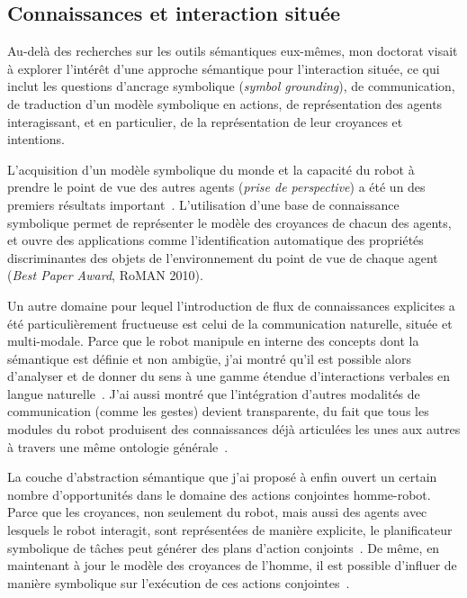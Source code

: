 \documentclass[a4paper]{article}
\begin{document}
\subsection{Connaissances et interaction située%
  \label{semantic-tools-for-grounded-interaction}%
}

Au-delà des recherches sur les outils sémantiques eux-mêmes, mon doctorat visait à
explorer l'intérêt d'une approche sémantique pour l'interaction située, ce qui
inclut les questions d'ancrage symbolique (\emph{symbol grounding}), de
communication, de traduction d'un modèle symbolique en actions, de
représentation des agents interagissant, et en particulier, de la représentation
de leur croyances et intentions.

L'acquisition d'un modèle symbolique du monde et la capacité du robot à prendre
le point de vue des autres agents (\emph{prise de perspective}) a été un des
premiers résultats important~\cite{Lemaignan2011}.  L'utilisation d'une base de
connaissance symbolique permet de représenter le modèle des croyances de chacun
des agents, et ouvre des applications comme l'identification automatique des
propriétés discriminantes des objets de l'environnement du point de vue de
chaque agent~\cite{ros2010which} (\emph{Best Paper Award}, RoMAN 2010).

Un autre domaine pour lequel l'introduction de flux de connaissances explicites
a été particulièrement fructueuse est celui de la communication naturelle,
située et multi-modale. Parce que le robot manipule en interne des concepts dont
la sémantique est définie et non ambigüe, j'ai montré qu'il est possible alors
d'analyser et de donner du sens à une gamme étendue d'interactions verbales en
langue naturelle~\cite{Ros2010a, lemaignan2011dialogue, lemaignan2013talking}.
J'ai aussi montré que l'intégration d'autres modalités de communication (comme
les gestes) devient transparente, du fait que tous les modules du robot
produisent des connaissances déjà articulées les unes aux autres à travers une
même ontologie générale~\cite{lemaignan2011what, Lemaignan2011a}.

La couche d'abstraction sémantique que j'ai proposé à enfin ouvert un certain
nombre d'opportunités dans le domaine des actions conjointes homme-robot. Parce
que les croyances, non seulement du robot, mais aussi des agents avec lesquels
le robot interagit, sont représentées de manière explicite, le planificateur
symbolique de tâches peut générer des plans d'action
conjoints~\cite{alami2011when, Lemaignan2012, clodic2013on}. De même, en
maintenant à jour le modèle des croyances de l'homme, il est possible d'influer
de manière symbolique sur l'exécution de ces actions
conjointes~\cite{gharbi2013natural}.
\end{document}
